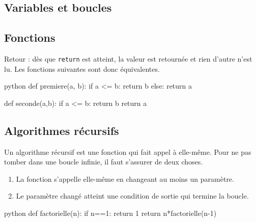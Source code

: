 \subsection{Variables et boucles}



\subsection{Fonctions}

Retour : dès que \texttt{return} est atteint, la valeur est retournée et rien d'autre n'est lu.
Les fonctions suivantes sont donc équivalentes.

\begin{mintedbox}{python}
def premiere(a, b):
	if a <= b:
		return b
	else:
		return a
		
def seconde(a,b):
	if a <= b:
		return b
	return a
\end{mintedbox}

\subsection{Algorithmes récursifs}

Un algorithme récursif est une fonction qui fait appel à elle-même.
Pour ne pas tomber dans une boucle infinie, il faut s'assurer de deux choses.
	\begin{enumerate}
		\item La fonction s'appelle elle-même en changeant au moins un paramètre.
		\item Le paramètre changé atteint une condition de sortie qui termine la boucle.
	\end{enumerate}

\begin{mintedbox}{python}
def factorielle(n):
	if n==1:
		return 1
	return n*factorielle(n-1)
\end{mintedbox}

